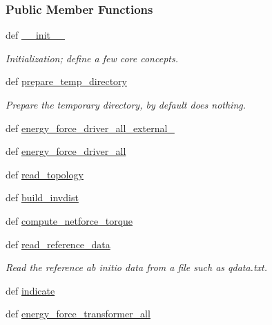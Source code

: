 \subsubsection*{\-Public \-Member \-Functions}
\begin{DoxyCompactItemize}
\item 
def \hyperlink{classforcebalance_1_1amberio_1_1AbInitio__AMBER_ab4a2fcc38e45455b90ada9daedcb180c}{\-\_\-\-\_\-init\-\_\-\-\_\-}
\begin{DoxyCompactList}\small\item\em \-Initialization; define a few core concepts. \end{DoxyCompactList}\item 
def \hyperlink{classforcebalance_1_1amberio_1_1AbInitio__AMBER_a1d224b2406545021d839c6189a0a4cdb}{prepare\-\_\-temp\-\_\-directory}
\begin{DoxyCompactList}\small\item\em \-Prepare the temporary directory, by default does nothing. \end{DoxyCompactList}\item 
def \hyperlink{classforcebalance_1_1amberio_1_1AbInitio__AMBER_ad0fcc43d857471ee074361076c040ea5}{energy\-\_\-force\-\_\-driver\-\_\-all\-\_\-external\-\_\-}
\item 
def \hyperlink{classforcebalance_1_1amberio_1_1AbInitio__AMBER_a64ccf943e550392c654ec7bb6c6ff81b}{energy\-\_\-force\-\_\-driver\-\_\-all}
\item 
def \hyperlink{classforcebalance_1_1abinitio_1_1AbInitio_a9f405c452a0a4081cd7da07938520920}{read\-\_\-topology}
\item 
def \hyperlink{classforcebalance_1_1abinitio_1_1AbInitio_a7475857193eefd4edd020d4f2a8fec17}{build\-\_\-invdist}
\item 
def \hyperlink{classforcebalance_1_1abinitio_1_1AbInitio_afbf86c26158a68cae7460b4106809fdd}{compute\-\_\-netforce\-\_\-torque}
\item 
def \hyperlink{classforcebalance_1_1abinitio_1_1AbInitio_aa73bedbf1e2cf19f2fa1e88815f1bd86}{read\-\_\-reference\-\_\-data}
\begin{DoxyCompactList}\small\item\em \-Read the reference ab initio data from a file such as qdata.\-txt. \end{DoxyCompactList}\item 
def \hyperlink{classforcebalance_1_1abinitio_1_1AbInitio_a3260db78e8c174f04a64661c4e5c181c}{indicate}
\item 
def \hyperlink{classforcebalance_1_1abinitio_1_1AbInitio_a3d28520925c6dfd179647d0abf7e1368}{energy\-\_\-force\-\_\-transformer\-\_\-all}

\end{DoxyCompactItemize}
